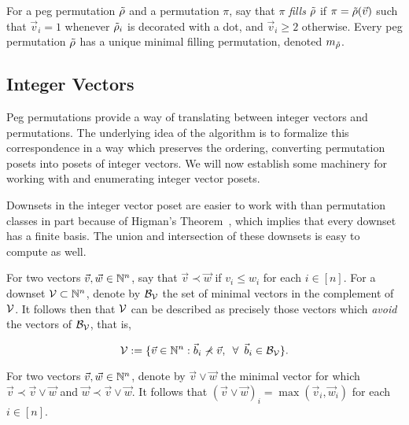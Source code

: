     \begin{definition} \label{polyclass:def:fillingperm}
      For a peg permutation $\tilde{\rho}$ and a permutation $\pi$, say that $\pi$
      \emph{fills} $\tilde{\rho}$ if $\pi = \tilde{\rho}(\vec v)$ such that $\vec v_i = 1$
      whenever $\tilde{\rho}_i$ is decorated with a dot, and $\vec v_i \geq 2$
      otherwise. Every peg permutation $\tilde{\rho}$ has a unique minimal filling
      permutation, denoted $m_{\tilde{\rho}}$. 
    \end{definition}

    



  \subsection{Integer Vectors}

    Peg permutations provide a way of translating between integer vectors and
    permutations. The underlying idea of the algorithm is to formalize this
    correspondence in a way which preserves the ordering, converting permutation
    posets into posets of integer vectors. We will now establish some machinery
    for working with and enumerating integer vector posets.

    Downsets in the integer vector poset are easier to work with than permutation
    classes in part because of Higman's Theorem~\cite{HigmansThm}, which
    implies that every downset has a finite basis. The union and intersection
    of these downsets is easy to compute as well. 

    \begin{definition} \label{polyclass:def:vecposet}
      For two vectors $\vec v, \vec w \in \mathbb{N}^n$, say that $\vec v \prec \vec
      w$ if $v_i \leq w_i$ for each $i \in [n]$.  For a downset $\mathcal{V} \subset
      \mathbb{N}^n$, denote by $\mathcal{B}_{\mathcal{V}}$ the set of minimal vectors in the
      complement of $\mathcal{V}$. It follows then that $\mathcal{V}$ can be described as
      precisely those vectors which \emph{avoid} the vectors of $\mathcal{B}_{\mathcal{V}}$, that
      is, 

      $$ \mathcal{V} := \{ \vec v \in \mathbb{N}^n : \vec b_i \not \prec \vec v, \enspace \forall \enspace
          \vec b_i \in \mathcal{B}_{\mathcal{V}} \}. $$

      For two vectors $\vec v, \vec w \in \mathbb{N}^n$, denote by $\vec v \vee \vec
      w$ the minimal vector for which $\vec v \prec \vec v \vee \vec w$ and $\vec
      w \prec \vec v \vee \vec w$. It follows that $ (\vec v \vee \vec w)_i =
      \max(\vec v_i, \vec w_i)$ for each $i \in [n]$. 
    \end{definition}


